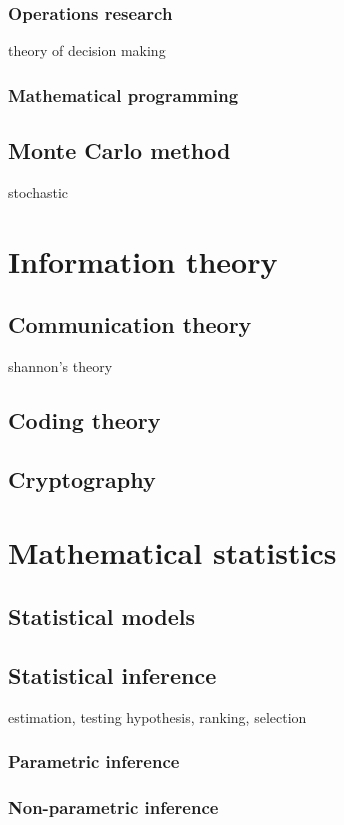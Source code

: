 \documentclass{../../large}
\begin{document}
\section{Operations research}
theory of decision making
\section{Mathematical programming}


\chapter{Monte Carlo method}
stochastic



\part{Information theory}
\chapter{Communication theory}
shannon's theory
\chapter{Coding theory}
\chapter{Cryptography}





\part{Mathematical statistics}
\chapter{Statistical models}
\chapter{Statistical inference}
estimation, testing hypothesis, ranking, selection
\section{Parametric inference}
\section{Non-parametric inference}


\chapter{}
\end{document}
